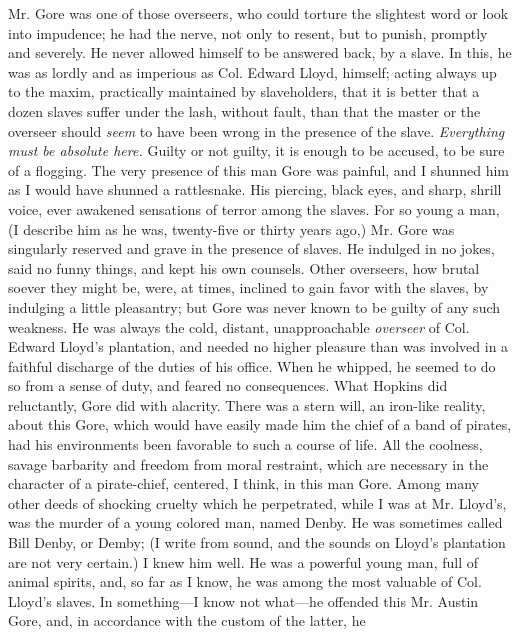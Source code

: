 Mr. Gore was one of those overseers, who could
{\protect\hypertarget{121}{}{}}torture the slightest word or look into
impudence; he had the nerve, not only to resent, but to punish, promptly
and severely. He never allowed himself to be answered back, by a slave.
In this, he was as lordly and as imperious as Col. Edward Lloyd,
himself; acting always up to the maxim, practically maintained by
slaveholders, that it is better that a dozen slaves suffer under the
lash, without fault, than that the master or the overseer should
\emph{seem} to have been wrong in the presence of the slave.
\emph{Everything must be absolute here.} Guilty or not guilty, it is
enough to be accused, to be sure of a flogging. The very presence of
this man Gore was painful, and I shunned him as I would have shunned a
rattlesnake. His piercing, black eyes, and sharp, shrill voice, ever
awakened sensations of terror among the slaves. For so young a man, (I
describe him as he was, twenty-five or thirty years ago,) Mr. Gore was
singularly reserved and grave in the presence of slaves. He indulged in
no jokes, said no funny things, and kept his own counsels. Other
overseers, how brutal soever they might be, were, at times, inclined to
gain favor with the slaves, by indulging a little pleasantry; but Gore
was never known to be guilty of any such weakness. He was always the
cold, distant, unapproachable \emph{overseer} of Col. Edward Lloyd's
plantation, and needed no higher pleasure than was involved in a
faithful discharge of the duties of his office. When he whipped, he
seemed to do so from a sense of duty, and feared no consequences. What
Hopkins did reluctantly, Gore did with alacrity. There was a stern will,
an iron-like reality, about this Gore, which
{\protect\hypertarget{122}{}{}}would have easily made him the chief of a
band of pirates, had his environments been favorable to such a course of
life. All the coolness, savage barbarity and freedom from moral
restraint, which are necessary in the character of a pirate-chief,
centered, I think, in this man Gore. Among many other deeds of shocking
cruelty which he perpetrated, while I was at Mr. Lloyd's, was the murder
of a young colored man, named Denby. He was sometimes called Bill Denby,
or Demby; (I write from sound, and the sounds on Lloyd's plantation are
not very certain.) I knew him well. He was a powerful young man, full of
animal spirits, and, so far as I know, he was among the most valuable of
Col. Lloyd's slaves. In something---I know not what---he offended this
Mr. Austin Gore, and, in accordance with the custom of the latter, he
